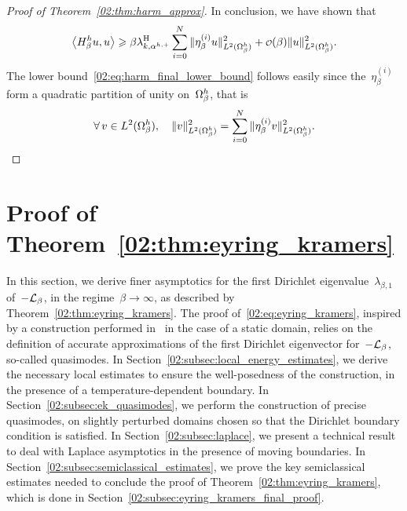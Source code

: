 \begin{proof}[Proof of Theorem~\ref{02:thm:harm_approx}]
        In conclusion, we have shown that
        \begin{equation}
            \left\langle H_\beta^h u,u \right\rangle \geq \beta\lambda_{k,\alpha^{\shift,+}}^{\mathrm H} \sum_{i=0}^{N}\|\eta_\beta^{(i)}u\|_{L^2(\Omega_\beta^\shift)}^2 + \smallo(\beta)\|u\|_{L^2(\Omega_\beta^\shift)}^2.
        \end{equation}
        The lower bound~\eqref{02:eq:harm_final_lower_bound} follows easily since the~$\eta_\beta^{(i)}$ form a quadratic partition of unity on~$\Omega_\beta^h$, that is
       ~$$\forall\,v\in L^2(\Omega_\beta^h),\quad\|v\|_{L^2(\Omega_\beta^h)}^2 = \sum_{i=0}^{N} \|\eta_\beta^{(i)}v\|_{L^2(\Omega_\beta^h)}^2.$$
    \end{proof}

    \section{Proof of Theorem~\ref{02:thm:eyring_kramers}}
    \label{02:sec:proof_ek}
    In this section, we derive finer asymptotics for the first Dirichlet eigenvalue~$\lambda_{\beta,1}$ of~$-\mathcal{L}_\beta$, in the regime~$\beta\to\infty$, as described by Theorem~\ref{02:thm:eyring_kramers}.
    The proof of~\eqref{02:eq:eyring_kramers}, inspired by a construction performed in~\cite{LPN21} in the case of a static domain, relies on the definition of accurate approximations of the first Dirichlet eigenvector for~$-\mathcal{L}_\beta$, so-called quasimodes.
    In Section~\ref{02:subsec:local_energy_estimates}, we derive the necessary local estimates to ensure the well-posedness of the construction, in the presence of a temperature-dependent boundary. In Section~\ref{02:subsec:ek_quasimodes}, we perform the construction of precise quasimodes, on slightly perturbed domains chosen so that the Dirichlet boundary condition is satisfied. In Section~\ref{02:subsec:laplace}, we present a technical result to deal with Laplace asymptotics in the presence of moving boundaries.
    In Section~\ref{02:subsec:semiclassical_estimates}, we prove the key semiclassical estimates needed to conclude the proof of Theorem~\ref{02:thm:eyring_kramers}, which is done in Section~\ref{02:subsec:eyring_kramers_final_proof}.
    
